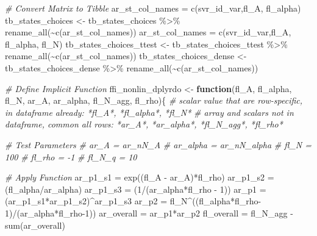\documentclass[
]{book}
\newenvironment{Shaded}{\begin{snugshade}}{\end{snugshade}}
\newcommand{\CommentTok}[1]{\textcolor[rgb]{0.56,0.35,0.01}{\textit{#1}}}
\newcommand{\ControlFlowTok}[1]{\textcolor[rgb]{0.13,0.29,0.53}{\textbf{#1}}}
\newcommand{\DecValTok}[1]{\textcolor[rgb]{0.00,0.00,0.81}{#1}}
\newcommand{\FunctionTok}[1]{\textcolor[rgb]{0.00,0.00,0.00}{#1}}
\newcommand{\NormalTok}[1]{#1}
\newcommand{\OtherTok}[1]{\textcolor[rgb]{0.56,0.35,0.01}{#1}}
\newcommand{\SpecialCharTok}[1]{\textcolor[rgb]{0.00,0.00,0.00}{#1}}
\newcommand{\StringTok}[1]{\textcolor[rgb]{0.31,0.60,0.02}{#1}}
\begin{document}
\begin{Shaded}
\begin{Highlighting}[]
\CommentTok{\# Convert Matrix to Tibble}
\NormalTok{ar\_st\_col\_names }\OtherTok{=} \FunctionTok{c}\NormalTok{(svr\_id\_var,}\StringTok{\textquotesingle{}fl\_A\textquotesingle{}}\NormalTok{, }\StringTok{\textquotesingle{}fl\_alpha\textquotesingle{}}\NormalTok{)}
\NormalTok{tb\_states\_choices }\OtherTok{\textless{}{-}}\NormalTok{ tb\_states\_choices }\SpecialCharTok{\%\textgreater{}\%} \FunctionTok{rename\_all}\NormalTok{(}\SpecialCharTok{\textasciitilde{}}\FunctionTok{c}\NormalTok{(ar\_st\_col\_names))}
\NormalTok{ar\_st\_col\_names }\OtherTok{=} \FunctionTok{c}\NormalTok{(svr\_id\_var,}\StringTok{\textquotesingle{}fl\_A\textquotesingle{}}\NormalTok{, }\StringTok{\textquotesingle{}fl\_alpha\textquotesingle{}}\NormalTok{, }\StringTok{\textquotesingle{}fl\_N\textquotesingle{}}\NormalTok{)}
\NormalTok{tb\_states\_choices\_ttest }\OtherTok{\textless{}{-}}\NormalTok{ tb\_states\_choices\_ttest }\SpecialCharTok{\%\textgreater{}\%} \FunctionTok{rename\_all}\NormalTok{(}\SpecialCharTok{\textasciitilde{}}\FunctionTok{c}\NormalTok{(ar\_st\_col\_names))}
\NormalTok{tb\_states\_choices\_dense }\OtherTok{\textless{}{-}}\NormalTok{ tb\_states\_choices\_dense }\SpecialCharTok{\%\textgreater{}\%} \FunctionTok{rename\_all}\NormalTok{(}\SpecialCharTok{\textasciitilde{}}\FunctionTok{c}\NormalTok{(ar\_st\_col\_names))}

\CommentTok{\# Define Implicit Function}
\NormalTok{ffi\_nonlin\_dplyrdo }\OtherTok{\textless{}{-}} \ControlFlowTok{function}\NormalTok{(fl\_A, fl\_alpha, fl\_N, ar\_A, ar\_alpha, fl\_N\_agg, fl\_rho)\{}
  \CommentTok{\# scalar value that are row{-}specific, in dataframe already: *fl\_A*, *fl\_alpha*, *fl\_N*}
  \CommentTok{\# array and scalars not in dataframe, common all rows: *ar\_A*, *ar\_alpha*, *fl\_N\_agg*, *fl\_rho*}

  \CommentTok{\# Test Parameters}
  \CommentTok{\# ar\_A = ar\_nN\_A}
  \CommentTok{\# ar\_alpha = ar\_nN\_alpha}
  \CommentTok{\# fl\_N = 100}
  \CommentTok{\# fl\_rho = {-}1}
  \CommentTok{\# fl\_N\_q = 10}

  \CommentTok{\# Apply Function}
\NormalTok{  ar\_p1\_s1 }\OtherTok{=} \FunctionTok{exp}\NormalTok{((fl\_A }\SpecialCharTok{{-}}\NormalTok{ ar\_A)}\SpecialCharTok{*}\NormalTok{fl\_rho)}
\NormalTok{  ar\_p1\_s2 }\OtherTok{=}\NormalTok{ (fl\_alpha}\SpecialCharTok{/}\NormalTok{ar\_alpha)}
\NormalTok{  ar\_p1\_s3 }\OtherTok{=}\NormalTok{ (}\DecValTok{1}\SpecialCharTok{/}\NormalTok{(ar\_alpha}\SpecialCharTok{*}\NormalTok{fl\_rho }\SpecialCharTok{{-}} \DecValTok{1}\NormalTok{))}
\NormalTok{  ar\_p1 }\OtherTok{=}\NormalTok{ (ar\_p1\_s1}\SpecialCharTok{*}\NormalTok{ar\_p1\_s2)}\SpecialCharTok{\^{}}\NormalTok{ar\_p1\_s3}
\NormalTok{  ar\_p2 }\OtherTok{=}\NormalTok{ fl\_N}\SpecialCharTok{\^{}}\NormalTok{((fl\_alpha}\SpecialCharTok{*}\NormalTok{fl\_rho}\DecValTok{{-}1}\NormalTok{)}\SpecialCharTok{/}\NormalTok{(ar\_alpha}\SpecialCharTok{*}\NormalTok{fl\_rho}\DecValTok{{-}1}\NormalTok{))}
\NormalTok{  ar\_overall }\OtherTok{=}\NormalTok{ ar\_p1}\SpecialCharTok{*}\NormalTok{ar\_p2}
\NormalTok{  fl\_overall }\OtherTok{=}\NormalTok{ fl\_N\_agg }\SpecialCharTok{{-}} \FunctionTok{sum}\NormalTok{(ar\_overall)}


\end{Highlighting}
\end{Shaded}
\end{document}
